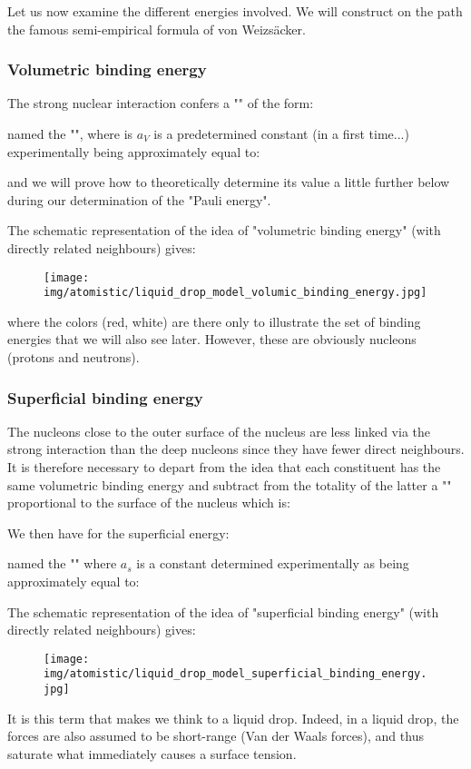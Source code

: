 	Let us now examine the different energies involved. We will construct on the path the famous semi-empirical formula of von Weizsäcker.
	
	\subsubsection{Volumetric binding energy}
	The strong nuclear interaction confers a "" of the form:
	
	named the "", where is $a_V$ is a predetermined constant (in a first time...) experimentally being approximately equal to:
	
	and we will prove how to theoretically determine its value a little further below during our determination of the "Pauli energy".

	The schematic representation of the idea of "volumetric binding energy" (with directly related neighbours) gives:
	\begin{figure}[H]
		\centering
		\texttt{[image: img/atomistic/liquid\_drop\_model\_volumic\_binding\_energy.jpg]}
	\end{figure}
	where the colors (red, white) are there only to illustrate the set of binding energies that we will also see later. However, these are obviously nucleons (protons and neutrons).
	
	\subsubsection{Superficial binding energy}
	The nucleons close to the outer surface of the nucleus are less linked via the strong interaction than the deep nucleons since they have fewer direct neighbours. It is therefore necessary to depart from the idea that each constituent has the same volumetric binding energy and subtract from the totality of the latter a "" proportional to the surface of the nucleus which is:
	
	We then have for the superficial energy:
	
	named the "" where $a_s$ is a constant determined experimentally as being approximately equal to:
	
	The schematic representation of the idea of "superficial binding energy" (with directly related neighbours) gives:
	\begin{figure}[H]
		\centering
		\texttt{[image: img/atomistic/liquid\_drop\_model\_superficial\_binding\_energy.jpg]}
	\end{figure}
	It is this term that makes we think to a liquid drop. Indeed, in a liquid drop, the forces are also assumed to be short-range (Van der Waals forces), and thus saturate what immediately causes a surface tension.
	
